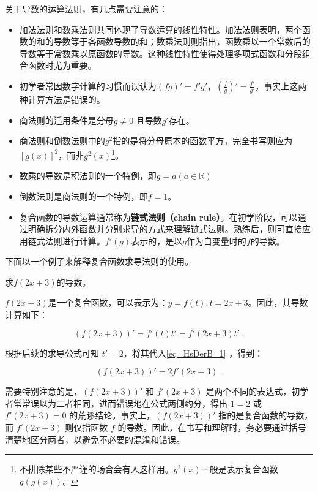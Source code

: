 关于导数的运算法则，有几点需要注意的：
\begin{itemize}
\item 加法法则和数乘法则共同体现了导数运算的线性特性。加法法则表明，两个函数的和的导数等于各函数导数的和；数乘法则则指出，函数乘以一个常数后的导数等于常数乘以原函数的导数。这种线性特性使得处理多项式函数和分段组合函数时尤为重要。
\item 初学者常因数字计算的习惯而误认为$(f  g)'= f' g'$，$\displaystyle\left(\frac{f}{g}\right)'=\frac{f'}{g'}$，事实上这两种计算方法是错误的。
\item 商法则的适用条件是分母$g\neq0$ 且导数$g'$存在。
\item 商法则和倒数法则中的$g^2$指的是将分母原本的函数平方，完全书写则应为$[g(x)]^2$，而非$g^2(x)$\footnote{不排除某些不严谨的场合会有人这样用。$g^2(x)$一般是表示复合函数$g\left(g(x)\right)$。}。
\item 数乘的导数是积法则的一个特例，即$g=a(a\in\mathbb{R})$
\item 倒数法则是商法则的一个特例，即$f=1$。
\item 复合函数的导数运算通常称为\textbf{链式法则（chain rule）}。在初学阶段，可以通过明确拆分内外函数并分别求导的方式来理解链式法则。熟练后，则可直接应用链式法则进行计算。$f'(g)$表示的，是以$g$作为自变量时的$f$的导数。
\end{itemize}

下面以一个例子来解释复合函数求导法则的使用。

\begin{example}{求$f(2x+3)$的导数。}

$f(2x+3)$是一个复合函数，可以表示为：$y = f(t) , t = 2x+3$。因此，其导数计算如下：

\begin{equation}\label{eq_HsDerB_1}
\left(f(2x+3)\right)' = f'(t)  t' = f'(2x+3)  t'~.
\end{equation}

根据后续的求导公式可知 $t' = 2$，将其代入\autoref{eq_HsDerB_1} ，得到：

\begin{equation}\label{eq_HsDerB_2}
\left(f(2x+3)\right)' = 2f'(2x+3)~.
\end{equation}

需要特别注意的是，$\left(f(2x+3)\right)'$ 和 $f'(2x+3)$ 是两个不同的表达式，初学者常常误以为二者相同，进而错误地在公式两侧约分，得出 $1 = 2$ 或 $f'(2x+3) = 0$ 的荒谬结论。事实上，$\left(f(2x+3)\right)'$ 指的是复合函数的导数，而 $f'(2x+3)$ 则仅指函数 $f$ 的导数。因此，在书写和理解时，务必要通过括号清楚地区分两者，以避免不必要的混淆和错误。
\end{example}


